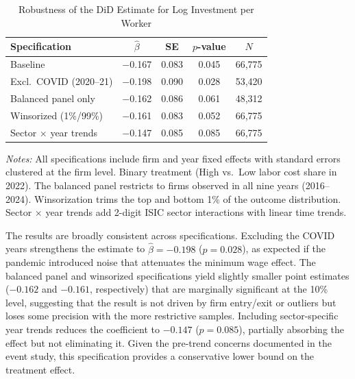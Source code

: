 \documentclass[5p,times,authoryear]{elsarticle}
\begin{document}
\begin{table}[htbp]
\centering
\begin{threeparttable}
\caption{Robustness of the DiD Estimate for Log Investment per Worker}
\label{tab:robustness}
\small
\setlength{\tabcolsep}{5pt}
\begin{tabular}{@{}lcccc@{}}
\toprule
Specification & $\hat{\beta}$ & SE & $p$-value & $N$ \\
\midrule
Baseline & $-$0.167 & 0.083 & 0.045 & 66,775 \\
Excl.\ COVID (2020--21) & $-$0.198 & 0.090 & 0.028 & 53,420 \\
Balanced panel only & $-$0.162 & 0.086 & 0.061 & 48,312 \\
Winsorized (1\%/99\%) & $-$0.161 & 0.083 & 0.052 & 66,775 \\
Sector $\times$ year trends & $-$0.147 & 0.085 & 0.085 & 66,775 \\
\bottomrule
\end{tabular}
\begin{tablenotes}
\footnotesize
\item \textit{Notes:} All specifications include firm and year fixed effects with standard errors clustered at the firm level. Binary treatment (High vs.\ Low labor cost share in 2022). The balanced panel restricts to firms observed in all nine years (2016--2024). Winsorization trims the top and bottom 1\% of the outcome distribution. Sector $\times$ year trends add 2-digit ISIC sector interactions with linear time trends.
\end{tablenotes}
\end{threeparttable}
\end{table}

The results are broadly consistent across specifications. Excluding the COVID years strengthens the estimate to $\hat{\beta} = -0.198$ ($p = 0.028$), as expected if the pandemic introduced noise that attenuates the minimum wage effect. The balanced panel and winsorized specifications yield slightly smaller point estimates ($-0.162$ and $-0.161$, respectively) that are marginally significant at the 10\% level, suggesting that the result is not driven by firm entry/exit or outliers but loses some precision with the more restrictive samples. Including sector-specific year trends reduces the coefficient to $-0.147$ ($p = 0.085$), partially absorbing the effect but not eliminating it. Given the pre-trend concerns documented in the event study, this specification provides a conservative lower bound on the treatment effect.
\end{document}
